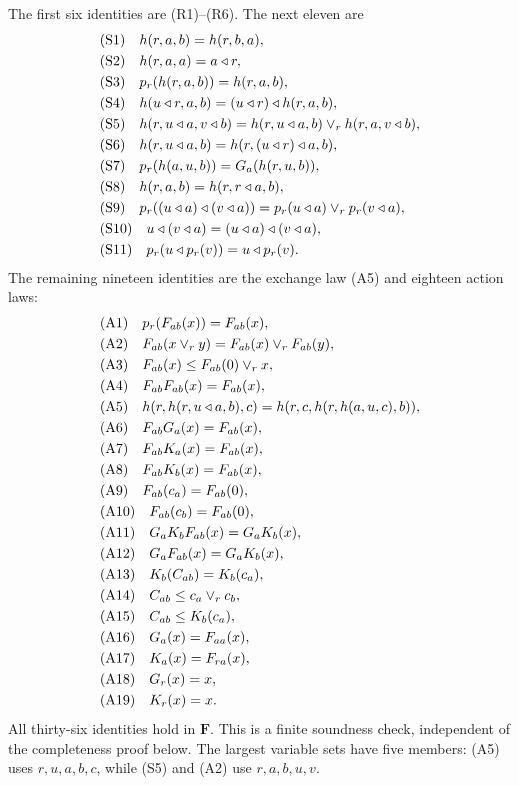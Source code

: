 The first six identities are (R1)--(R6). The next eleven are
\begin{align*}
 &\text{(S1)}\quad h(r,a,b)=h(r,b,a),\\
 &\text{(S2)}\quad h(r,a,a)=a\mathbin{\triangleleft} r,\\
 &\text{(S3)}\quad p_r(h(r,a,b))=h(r,a,b),\\
 &\text{(S4)}\quad h(u\mathbin{\triangleleft} r,a,b)=(u\mathbin{\triangleleft} r)\mathbin{\triangleleft} h(r,a,b),\\
 &\text{(S5)}\quad
 h(r,u\mathbin{\triangleleft} a,v\mathbin{\triangleleft} b)
   =h(r,u\mathbin{\triangleleft} a,b)\vee_r h(r,a,v\mathbin{\triangleleft} b),\\
 &\text{(S6)}\quad
 h(r,u\mathbin{\triangleleft} a,b)=h(r,(u\mathbin{\triangleleft} r)\mathbin{\triangleleft} a,b),\\
 &\text{(S7)}\quad p_r(h(a,u,b))=G_a(h(r,u,b)),\\
 &\text{(S8)}\quad h(r,a,b)=h(r,r\mathbin{\triangleleft} a,b),\\
 &\text{(S9)}\quad
 p_r((u\mathbin{\triangleleft} a)\mathbin{\triangleleft}(v\mathbin{\triangleleft} a))
     =p_r(u\mathbin{\triangleleft} a)\vee_r p_r(v\mathbin{\triangleleft} a),\\
 &\text{(S10)}\quad u\mathbin{\triangleleft}(v\mathbin{\triangleleft} a)=(u\mathbin{\triangleleft} a)\mathbin{\triangleleft}(v\mathbin{\triangleleft} a),\\
 &\text{(S11)}\quad p_r(u\mathbin{\triangleleft} p_r(v))=u\mathbin{\triangleleft} p_r(v).
\end{align*}
The remaining nineteen identities are the exchange law (A5) and eighteen
action laws:
\begin{align*}
 &\text{(A1)}\quad p_r(F_{ab}(x))=F_{ab}(x),\\
 &\text{(A2)}\quad F_{ab}(x\vee_r y)=F_{ab}(x)\vee_r F_{ab}(y),\\
 &\text{(A3)}\quad F_{ab}(x)\leq F_{ab}(0)\vee_r x,\\
 &\text{(A4)}\quad F_{ab}F_{ab}(x)=F_{ab}(x),\\
 &\text{(A5)}\quad
 h(r,h(r,u\mathbin{\triangleleft} a,b),c)=h(r,c,h(r,h(a,u,c),b)),\\
 &\text{(A6)}\quad F_{ab}G_a(x)=F_{ab}(x),\\
 &\text{(A7)}\quad F_{ab}K_a(x)=F_{ab}(x),\\
 &\text{(A8)}\quad F_{ab}K_b(x)=F_{ab}(x),\\
 &\text{(A9)}\quad F_{ab}(c_a)=F_{ab}(0),\\
 &\text{(A10)}\quad F_{ab}(c_b)=F_{ab}(0),\\
 &\text{(A11)}\quad G_aK_bF_{ab}(x)=G_aK_b(x),\\
 &\text{(A12)}\quad G_aF_{ab}(x)=G_aK_b(x),\\
 &\text{(A13)}\quad K_b(C_{ab})=K_b(c_a),\\
 &\text{(A14)}\quad C_{ab}\leq c_a\vee_r c_b,\\
 &\text{(A15)}\quad C_{ab}\leq K_b(c_a),\\
 &\text{(A16)}\quad G_a(x)=F_{aa}(x),\\
 &\text{(A17)}\quad K_a(x)=F_{ra}(x),\\
 &\text{(A18)}\quad G_r(x)=x,\\
 &\text{(A19)}\quad K_r(x)=x.
\end{align*}
All thirty-six identities hold in $\mathbf F$. This is a finite soundness
check, independent of the completeness proof below. The largest
variable sets have five members: (A5) uses $r,u,a,b,c$, while (S5)
and (A2) use $r,a,b,u,v$.

